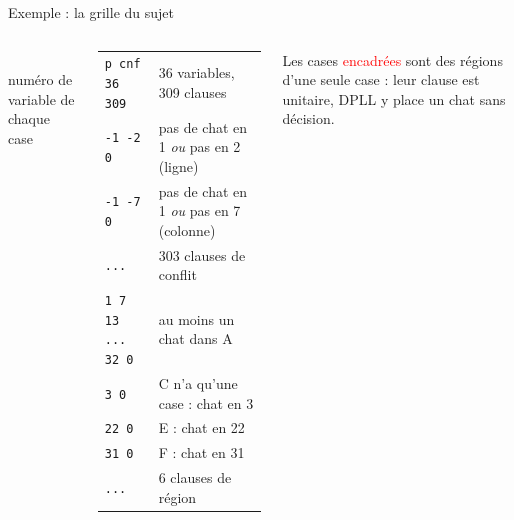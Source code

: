 \documentclass[aspectratio=169,11pt]{beamer}
\newcommand{\sujet}{{A,B,C,B,B,D},{A,B,B,B,B,D},{A,A,B,D,D,D},{A,A,A,E,D,D},{A,A,A,A,D,D},{F,A,D,D,D,D}}
\begin{document}
\begin{frame}{Exemple : la grille du sujet}
  \begin{columns}[c]
    \centering
     \\[2pt]
    \footnotesize numéro de variable de chaque case
    {\small\begin{tabular}{@{}l@{\quad}l@{}}
      \texttt{p cnf 36 309} & 36 variables, 309 clauses \\[4pt]
      \texttt{-1 -2 0}      & pas de chat en 1 \emph{ou} pas en 2 (ligne) \\
      \texttt{-1 -7 0}      & pas de chat en 1 \emph{ou} pas en 7 (colonne) \\
      \texttt{...}          & 303 clauses de conflit \\[4pt]
      \texttt{1 7 13 ... 32 0} & au moins un chat dans A \\
      \texttt{3 0}          & C n'a qu'une case : chat en 3 \\
      \texttt{22 0}         & E : chat en 22 \\
      \texttt{31 0}         & F : chat en 31 \\
      \texttt{...}          & 6 clauses de région \\
    \end{tabular}}
    \bigskip

    Les cases \textcolor{red}{encadrées} sont des régions d'une seule case :
    leur clause est unitaire, DPLL y place un chat sans décision.
  \end{columns}
\end{frame}
\end{document}
